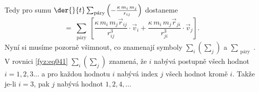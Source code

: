     Tedy pro sumu \(\der{ }{t}\sum_{\substack{\text{páry}}}
    \left(-\frac{\kappa\,m_i\,m_j}{r_{ij}}\right)\) dostaneme
    \begin{equation}\label{fyz:eq043}
     =  \sum_{\substack{\text{páry}}}
              \left[
                \frac{\kappa\,m_i\,m_j\vec{r}_{ij}}{r_{ij}^3}\cdot\vec{v}_i +
                \frac{\kappa\,m_i\,m_j\vec{r}_{ji}}{r_{ji}^3}\cdot\vec{v}_j 
              \right].
    \end{equation}
    Nyní si musíme pozorně všimnout, co znamenají symboly \(\sum_i\left(\sum_j\right)\) a 
    \(\sum_{\substack{\text{páry}}}\). V rovnici \ref{fyz:eq041} \(\sum_i\left(\sum_j\right)\) 
    znamená, že \(i\) nabývá postupně všech hodnot \(i = 1, 2, 3 \ldots\) a pro každou hodnotu 
    \(i\) nabývá index \(j\) všech hodnot kromě \(i\). Takže je-li \(i = 3\), pak \(j\) nabývá 
    hodnot \(1, 2, 4, \ldots\)
    
